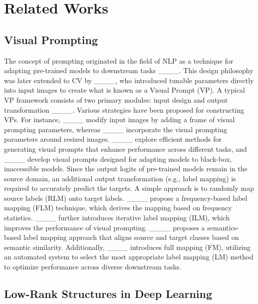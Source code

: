 \section{Related Works}
\subsection{Visual Prompting}
The concept of prompting originated in the field of NLP as a technique for adapting pre-trained models to downstream tasks ____. This design philosophy was later extended to CV by ____, who introduced tunable parameters directly into input images
 to create what is known as a Visual Prompt (VP). 
A typical VP framework consists of two primary modules: input design and output transformation ____. 
Various strategies have been proposed for constructing VPs.
For instance, ____ modify input images by adding a frame of visual prompting parameters, whereas ____ incorporate the visual prompting parameters around resized images. ____ 
explore efficient methods for generating visual prompts that enhance performance across different tasks, and ____ develop visual prompts designed for adapting models to black-box, inaccessible models. Since the output logits of pre-trained models remain in the source domain, an additional output transformation (e.g., label mapping) is required to accurately predict the targets. A simple approach is to randomly map source labels (RLM) onto target labels. ____ propose a frequency-based label mapping (FLM) technique, which derives the mapping based on frequency statistics. ____ further introduces iterative label mapping (ILM), which improves the performance of visual prompting. ____ proposes a semantics-based label mapping approach that aligns source and target classes based on semantic similarity. Additionally, ____ introduces full mapping (FM), utilizing an automated system to select the most appropriate label mapping (LM) method to optimize performance across diverse downstream tasks.

\subsection{Low-Rank Structures in Deep Learning}

